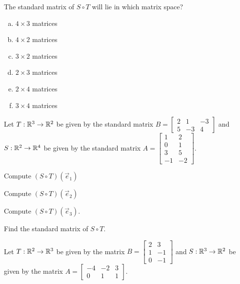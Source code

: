 \begin{applicationActivities}{1}{21}
\begin{activity}{2}
The standard matrix of $S \circ T$ will lie in which matrix space?
\begin{enumerate}[(a)]
\item $4 \times 3$ matrices
\item $4 \times 2$ matrices
\item $3 \times 2$ matrices
\item $2 \times 3$ matrices
\item $2 \times 4$ matrices
\item $3 \times 4$ matrices
\end{enumerate}
\end{activity}

\begin{activity}{15}
Let $T: \mathbb{R}^3 \rightarrow \mathbb{R}^2$ be given by the standard matrix $B=\begin{bmatrix} 2 & 1 & -3 \\ 5 & -3 & 4 \end{bmatrix}$ and $S: \mathbb{R}^2 \rightarrow \mathbb{R}^4$ be given by the standard matrix $A=\begin{bmatrix} 1 & 2 \\ 0 & 1 \\ 3 & 5 \\ -1 & -2 \end{bmatrix}$.

\begin{subactivity}
Compute $(S \circ T)(\vec{e}_1)$
\end{subactivity}
\begin{subactivity}
Compute  $(S \circ T)(\vec{e}_2)$
\end{subactivity}
\begin{subactivity}
Compute $(S \circ T)(\vec{e}_3)$.
\end{subactivity}
\begin{subactivity}
Find the standard matrix of $S \circ T$.
\end{subactivity}
\end{activity}


\begin{activity}{2}
Let $T: \mathbb{R}^2 \rightarrow \mathbb{R}^3$ be given by the matrix $B=\begin{bmatrix} 2 & 3 \\ 1 & -1 \\ 0 & -1 \end{bmatrix}$ and $S: \mathbb{R}^3 \rightarrow \mathbb{R}^2$ be given by the matrix $A=\begin{bmatrix} -4 & -2 & 3 \\ 0 & 1 & 1 \end{bmatrix}$.


\end{activity}
\end{applicationActivities}
